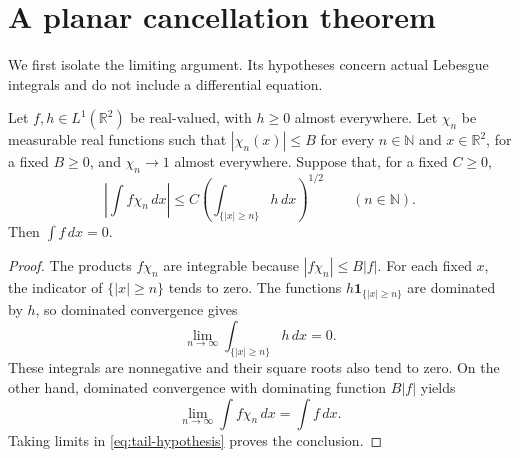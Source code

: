 \documentclass[10pt,twoside]{article}
\newcommand{\R}{\mathbb R}
\newcommand{\dd}{\,dx}
\begin{document}
\section{A planar cancellation theorem}\label{sec:cancellation}
We first isolate the limiting argument. Its hypotheses concern actual
Lebesgue integrals and do not include a differential equation.

\begin{lemma}\label{lem:tail}
Let $f,h\in L^1(\R^2)$ be real-valued, with $h\ge0$ almost everywhere.
Let $\chi_n$ be measurable real functions such that
$|\chi_n(x)|\le B$ for every $n\in\mathbb N$ and $x\in\R^2$,
for a fixed $B\ge0$, and $\chi_n\to1$ almost everywhere.
Suppose that, for a fixed $C\ge0$,
\begin{equation}\label{eq:tail-hypothesis}
 \left|\int f\chi_n\dd\right|
   \le C\left(\int_{\{|x|\ge n\}}h\dd\right)^{1/2}
       \qquad(n\in\mathbb N).
\end{equation}
Then $\int f\dd=0$.
\end{lemma}
\begin{proof}
The products $f\chi_n$ are integrable because $|f\chi_n|\le B|f|$.
For each fixed $x$, the indicator of $\{|x|\ge n\}$ tends to zero.
The functions $h\mathbf1_{\{|x|\ge n\}}$ are dominated by $h$,
so dominated convergence gives
\[
 \lim_{n\to\infty}\int_{\{|x|\ge n\}}h\dd=0.
\]
These integrals are nonnegative and their square roots also tend to zero.
On the other hand, dominated convergence with dominating function
$B|f|$ yields
\[
 \lim_{n\to\infty}\int f\chi_n\dd=\int f\dd.
\]
Taking limits in \eqref{eq:tail-hypothesis} proves the conclusion.
\end{proof}
\end{document}
